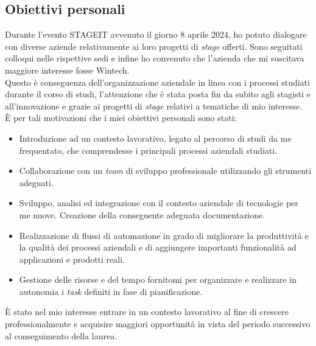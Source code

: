 \subsection{Obiettivi personali}
Durante l'evento STAGEIT avvenuto il giorno 8 aprile 2024, ho potuto dialogare con diverse aziende relativamente ai loro progetti di \emph{stage} offerti. Sono seguitati colloqui nelle rispettive sedi e infine ho convenuto che l'azienda che mi suscitava maggiore interesse fosse Wintech.\\
Questo è conseguenza dell'organizzazione aziendale in linea con i processi studiati durante il corso di studi, l'attenzione che è stata posta fin da subito agli stagisti e all'innovazione e grazie ai progetti di \emph{stage} relativi a tematiche di mio interesse.\\
È per tali motivazioni che i miei obiettivi personali sono stati:
\begin{itemize}
    \item Introduzione ad un contesto lavorativo, legato al percorso di studi da me frequentato, che comprendesse i principali processi aziendali studiati. 
    \item Collaborazione con un \emph{team} di sviluppo professionale utilizzando gli strumenti adeguati. 
    \item Sviluppo, analisi ed integrazione con il contesto aziendale di tecnologie per me nuove. Creazione della conseguente adeguata documentazione. 
    \item Realizzazione di flussi di automazione in grado di migliorare la produttività e la qualità dei processi aziendali e di aggiungere importanti funzionalità ad applicazioni e prodotti reali. 
    \item Gestione delle risorse e del tempo fornitomi per organizzare e realizzare in autonomia i \emph{task} definiti in fase di pianificazione.\\
\end{itemize}
È stato nel mio interesse entrare in un contesto lavorativo al fine di crescere professionalmente e acquisire maggiori opportunità in vista del periodo successivo al conseguimento della laurea. 
 
 
